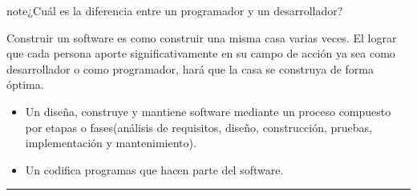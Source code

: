 \documentclass[letterpaper,10pt,spanish]{sphinxmanual}
\begin{document}
\begin{sphinxadmonition}{note}{¿Cuál es la diferencia entre un programador y un desarrollador?}

\sphinxAtStartPar
Construir un software es como construir una misma casa varias veces. El lograr que cada persona aporte significativamente en su campo de acción ya sea como desarrollador o como programador, hará que la casa se construya de forma óptima.
\begin{itemize}
\item {} 
\sphinxAtStartPar
Un  diseña, construye y mantiene software mediante un proceso compuesto por etapas o fases(análisis de requisitos, diseño, construcción, pruebas, implementación y mantenimiento).

\item {} 
\sphinxAtStartPar
Un  codifica programas que hacen parte del software.

\end{itemize}
\end{sphinxadmonition}


\bigskip\hrule\bigskip
\end{document}
